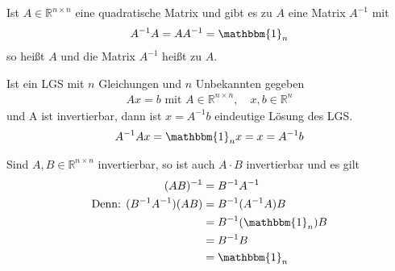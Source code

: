 
Ist $A \in \mathbb{R}^{n \times n}$ eine quadratische Matrix und gibt es zu $A$ eine Matrix $A^{-1}$ mit
\begin{align*}
	A^{-1} A = A A^{-1} = \mathbbm{1}_n
\end{align*}
so heißt $A$  und die Matrix $A^{-1}$ heißt  zu $A$.

\vspace{1cm}

Ist ein LGS mit $n$ Gleichungen und $n$ Unbekannten gegeben
\begin{align*}
	Ax = b\text{ mit }A \in \mathbb{R}^{n \times n},\quad x, b \in \mathbb{R}^n
\end{align*}
und A ist invertierbar, dann ist $x = A^{-1}b$ eindeutige Lösung des LGS.
\begin{align*}
	A^{-1}Ax = \mathbbm{1}_nx = x = A^{-1}b
\end{align*}

Sind $A, B \in \mathbb{R}^{n \times n}$ invertierbar, so ist auch $A \cdot B$ invertierbar und es gilt
\begin{align*}
	(AB)^{-1} &= B^{-1}A^{-1} \\
	\text{Denn: } (B^{-1}A^{-1})(AB) &= B^{-1}(A^{-1}A)B \\
	&= B^{-1} (\mathbbm{1}_n) B \\
	&= B^{-1}B \\
	&= \mathbbm{1}_n
\end{align*}

